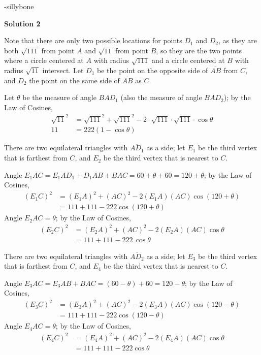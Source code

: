 \begin{enumerate}
 -sillybone

 



\textbf{Solution 2}

Note that there are only two possible locations for points $D_1$ and $D_2$, as they are both $\sqrt{111}$ from point $A$ and $\sqrt{11}$ from point $B$, so they are the two points where a circle centered at $A$ with radius $\sqrt{111}$ and a circle centered at $B$ with radius $\sqrt{11}$ intersect.  Let $D_1$ be the point on the opposite side of $\overline{AB}$ from $C$, and $D_2$ the point on the same side of $\overline{AB}$ as $C$.

 Let $\theta$ be the measure of angle $BAD_1$ (also the measure of angle $BAD_2$); by the Law of Cosines,
 \begin{align*}\sqrt{11}^2 &= \sqrt{111}^2 + \sqrt{111}^2 - 2 \cdot \sqrt{111} \cdot \sqrt{111} \cdot \cos\theta\\ 11 &= 222(1 - \cos\theta)\end{align*}


 There are two equilateral triangles with $\overline{AD_1}$ as a side; let $E_1$ be the third vertex that is farthest from $C$, and $E_2$ be the third vertex that is nearest to $C$.

 Angle $E_1AC = E_1AD_1 + D_1AB + BAC = 60 + \theta + 60 = 120 + \theta$; by the Law of Cosines,
 \begin{align*}(E_1C)^2 &= (E_1A)^2 + (AC)^2 - 2 (E_1A) (AC)\cos(120 + \theta)\\ &= 111 + 111 - 222\cos(120 + \theta)\end{align*}
Angle $E_2AC = \theta$; by the Law of Cosines,
 \begin{align*}(E_2C)^2 &= (E_2A)^2 + (AC)^2 - 2 (E_2A) (AC)\cos\theta\\ &= 111 + 111 - 222\,\cos\theta\end{align*}


 There are two equilateral triangles with $\overline{AD_2}$ as a side; let $E_3$ be the third vertex that is farthest from $C$, and $E_4$ be the third vertex that is nearest to $C$.

 Angle $E_3AC = E_3AB + BAC = (60 - \theta) + 60 = 120 - \theta$; by the Law of Cosines,
 \begin{align*}(E_3C)^2 &= (E_3A)^2 + (AC)^2 - 2 (E_3A) (AC)\cos(120 - \theta)\\ &= 111 + 111 - 222\cos(120 - \theta)\end{align*}
Angle $E_4AC = \theta$; by the Law of Cosines,
 \begin{align*}(E_4C)^2 &= (E_4A)^2 + (AC)^2 - 2 (E_4A) (AC)\cos\theta \\ &= 111 + 111 - 222\cos\theta\end{align*}



\end{enumerate}
